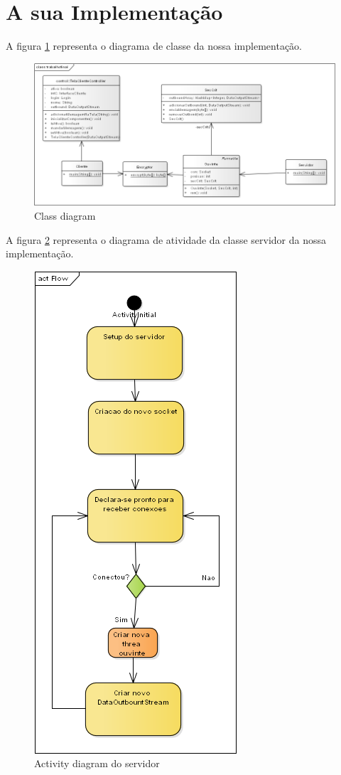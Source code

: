 \documentclass[a4paper,12pt]{article}
\begin{document}
\section{A sua Implementação}

A figura \ref{fig2} representa o diagrama de classe da nossa implementação.
\begin{figure}[H]
	\includegraphics[scale=0.5]{img/class.png}    
	\caption{Class diagram}
	\centering
	\label{fig2}
\end{figure} 




A figura \ref{fig3} representa o diagrama de atividade da classe servidor da nossa
implementação.
\begin{figure}[H]
	\centering
	\includegraphics[scale=0.5]{img/serverflow.png}    
	\caption{Activity diagram do servidor}
	
	\label{fig3}
\end{figure}
\end{document}
